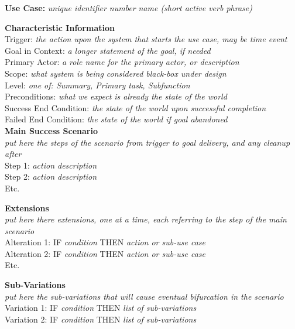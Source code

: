 {\bf Use Case:} {\it unique identifier number} {\it name (short active verb phrase)} 

{\bf Characteristic Information} \\
Trigger: {\it the action upon the system that starts the use case, may be time event} \\
Goal in Context: {\it a longer statement of the goal, if needed} \\
Primary Actor: {\it a role name for the primary actor, or description} \\
Scope: {\it what system is being considered black-box under design} \\
Level: {\it one of: Summary, Primary task, Subfunction} \\
Preconditions: {\it what we expect is already the state of the world} \\
Success End Condition: {\it the state of the world upon successful completion} \\
Failed End Condition: {\it the state of the world if goal abandoned} \\

{\bf Main Success Scenario} \\
{\it put here the steps of the scenario from trigger to goal delivery, and any cleanup after} \\
Step 1: {\it action description} \\
Step 2: {\it action description} \\
Etc.

{\bf Extensions} \\
{\it put here there extensions, one at a time, each referring to the step of the main scenario} \\
Alteration 1: IF {\it condition} THEN {\it action or sub-use case} \\
Alteration 2: IF {\it condition} THEN {\it action or sub-use case} \\
Etc.

{\bf Sub-Variations} \\
{\it put here the sub-variations that will cause eventual bifurcation in the scenario} \\
Variation 1: IF {\it condition} THEN {\it list of sub-variations} \\
Variation 2: IF {\it condition} THEN {\it list of sub-variations} \\

